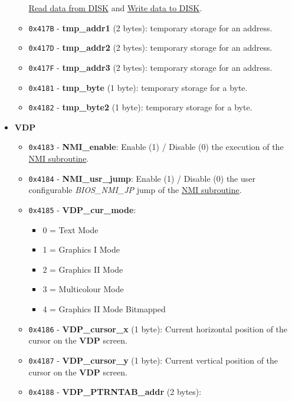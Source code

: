 \documentclass[a4paper,11pt]{article}
\begin{document}
\begin{itemize}
\begin{itemize}
            \hyperref[sec:howto_readdata]{Read data from DISK} and 
            \hyperref[sec:howto_writedata]{Write data to DISK}.
            \item \texttt{0x417B} - \textbf{tmp\_addr1} (2 bytes): temporary
            storage for an address.
            \item \texttt{0x417D} - \textbf{tmp\_addr2} (2 bytes): temporary
            storage for an address.
            \item \texttt{0x417F} - \textbf{tmp\_addr3} (2 bytes): temporary
            storage for an address.
            \item \texttt{0x4181} - \textbf{tmp\_byte} (1 byte): temporary
            storage for a byte.
            \item \texttt{0x4182} - \textbf{tmp\_byte2} (1 byte): temporary
            storage for a byte.
        \end{itemize}
        \item \textbf{VDP}
        \begin{itemize}
            \item \texttt{0x4183} - \textbf{NMI\_enable}: Enable (1) / Disable
            (0) the execution of the \hyperref[sec:nmi]{NMI subroutine}.
            \item \texttt{0x4184} - \textbf{NMI\_usr\_jump}: Enable (1) / Disable
            (0) the user configurable \textit{BIOS\_NMI\_JP} jump of the 
            \hyperref[sec:nmi]{NMI subroutine}.
            \item \texttt{0x4185} - \textbf{VDP\_cur\_mode}:
            \begin{itemize}
                \item 0 = Text Mode
                \item 1 = Graphics I Mode
                \item 2 = Graphics II Mode
                \item 3 = Multicolour Mode
                \item 4 = Graphics II Mode Bitmapped
            \end{itemize}
            \item \texttt{0x4186} - \textbf{VDP\_cursor\_x} (1 byte): Current
            horizontal position of the cursor on the \textbf{VDP} screen.
            \item \texttt{0x4187} - \textbf{VDP\_cursor\_y} (1 byte): Current
            vertical position of the cursor on the \textbf{VDP} screen.
            \item \texttt{0x4188} - \textbf{VDP\_PTRNTAB\_addr} (2 bytes):

\end{itemize}
\end{itemize}
\end{document}
